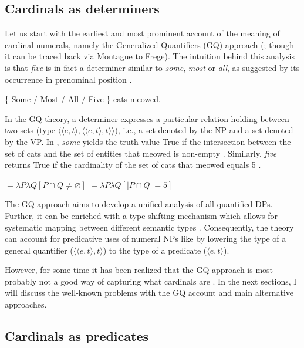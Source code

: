 \documentclass[output=paper]{langscibook}
\begin{document}
	\subsection{Cardinals as determiners}\label{sec:cardinals-as-determiners}
	
Let us start with the earliest and most prominent account of the meaning of cardinal numerals, namely the Generalized Quantifiers (GQ) approach (\citealt{barwise_cooper1981generalized}; though it can be traced back via Montague to Frege). The intuition behind this analysis is that \textit{five} is in fact a determiner similar to \textit{some}, \textit{most} or \textit{all}, as suggested by its occurrence in prenominal position .
	
	\ea \{ Some / Most / All / Five \} cats meowed.\label{ex:determiners}
	\z
	
	\noindent In the GQ theory, a determiner expresses a particular relation holding between two sets (type $\langle\langle e,t\rangle,\langle\langle e,t\rangle,t\rangle\rangle$), i.e., a set denoted by the NP and a set denoted by the VP. In , \textit{some} yields the truth value True if the intersection between the set of cats and the set of entities that meowed is non-empty . Similarly, \textit{five} returns True if the cardinality of the set of cats that meowed equals 5 .
	
	\ea \ea {} $=\lambda P \lambda Q[P \cap Q\neq\varnothing]$\label{ex:some-quantifier}
	\ex {} $=\lambda P \lambda Q[|P \cap Q|=5]$\label{ex:five-quantifier}
	\z
	\z

\noindent The GQ approach aims to develop a unified analysis of all quantified DPs. Further, it can be enriched with a type-shifting mechanism which allows for systematic mapping between different semantic types \citep{partee87}. Consequently, the theory can account for predicative uses of numeral NPs like  by lowering the type of a general quantifier ($\langle\langle e,t\rangle,t\rangle$) to the type of a predicate ($\langle e,t\rangle$).

However, for some time it has been realized that the GQ approach is most probably not a good way of capturing what cardinals are \citep[e.g.,][]{krifka1999least,landman2003predicate}. In the next sections, I will discuss the well-known problems with the GQ account and main alternative approaches.

\subsection{Cardinals as predicates}\label{sec:cardinals-as-predicates}
\end{document}
